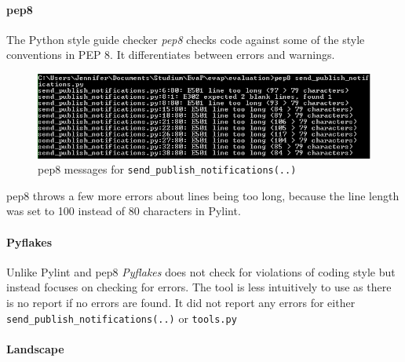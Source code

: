 \paragraph{pep8}
The Python style guide checker \emph{pep8} checks code against some of the style conventions in PEP 8.
It differentiates between errors and warnings.
\begin{figure}[h]
    \centering
    \includegraphics[width=\textwidth, keepaspectratio]{graphics/pep8_send_publish_notifications_1}
    \caption{pep8 messages for \texttt{send\_publish\_notifications(..)}}
    \label{fig:pep8}
\end{figure} 
pep8 throws a few more errors about lines being too long, because the line length was set to 100 instead of 80 characters in Pylint.

\paragraph{Pyflakes}
Unlike Pylint and pep8 \emph{Pyflakes} does not check for violations of coding style but instead focuses on checking for errors.
The tool is less intuitively to use as there is no report if no errors are found. 
It did not report any errors for either \texttt{send\_publish\_notifications(..)} or \texttt{tools.py}

\paragraph{Landscape}
